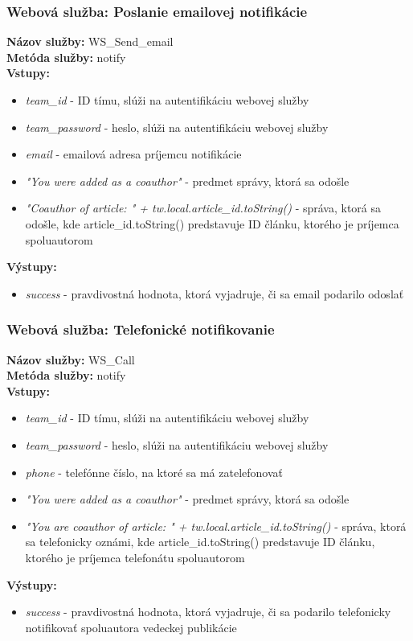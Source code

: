 \documentclass[10pt,oneside,slovak,a4paper]{article}
\begin{document}
\subsubsection{Webová služba: Poslanie emailovej notifikácie}
\textbf{Názov služby:} WS\_Send\_email\\
\textbf{Metóda služby:} notify\\
\textbf{Vstupy:}
	\begin{itemize}
		\item \textit{team\_id} - ID tímu, slúži na autentifikáciu webovej služby
		\item \textit{team\_password} - heslo, slúži na autentifikáciu webovej služby
		\item \textit{email} - emailová adresa príjemcu notifikácie
		\item \textit{"You were added as a coauthor"} - predmet správy, ktorá sa odošle
		\item \textit{"Coauthor of article: " + tw.local.article\_id.toString()} - správa, ktorá sa odošle, kde article\_id.toString() predstavuje ID článku, ktorého je príjemca spoluautorom
	\end{itemize}
\textbf{Výstupy:}
	\begin{itemize}
		\item \textit{success} - pravdivostná hodnota, ktorá vyjadruje, či sa email podarilo odoslať
	\end{itemize}

\subsubsection{Webová služba: Telefonické notifikovanie}
\textbf{Názov služby:} WS\_Call\\
\textbf{Metóda služby:} notify\\
\textbf{Vstupy:}
	\begin{itemize}
		\item \textit{team\_id} - ID tímu, slúži na autentifikáciu webovej služby
		\item \textit{team\_password} - heslo, slúži na autentifikáciu webovej služby
		\item \textit{phone} - telefónne číslo, na ktoré sa má zatelefonovať
		\item \textit{"You were added as a coauthor"} - predmet správy, ktorá sa odošle
		\item \textit{"You are coauthor of article: " + tw.local.article\_id.toString()} - správa, ktorá sa telefonicky oznámi, kde article\_id.toString() predstavuje ID článku, ktorého je príjemca telefonátu spoluautorom
	\end{itemize}
\textbf{Výstupy:}
	\begin{itemize}
		\item \textit{success} - pravdivostná hodnota, ktorá vyjadruje, či sa podarilo telefonicky notifikovať spoluautora vedeckej publikácie
	\end{itemize}
\end{document}
